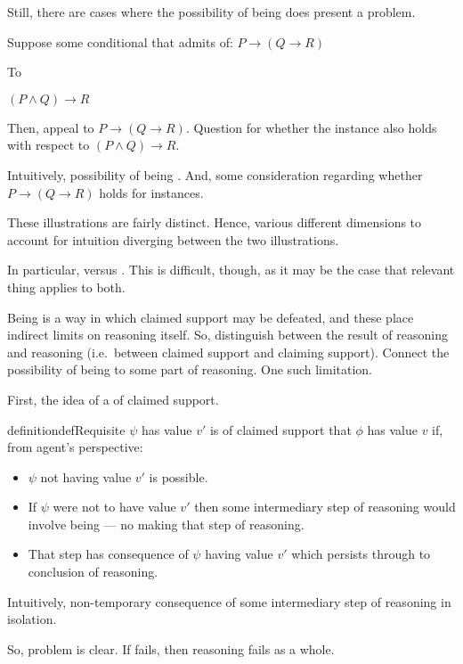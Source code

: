 \begin{note}
  Still, there are cases where the possibility of being \mom{} does present a problem.

  \begin{illustration}
    Suppose some conditional that admits of:
    \(P \rightarrow (Q \rightarrow R)\)

    To

    \((P \land Q) \rightarrow R\)

    Then, appeal to \(P \rightarrow (Q \rightarrow R)\).
    Question for whether the instance also holds with respect to \((P \land Q) \rightarrow R\).
  \end{illustration}

  Intuitively, possibility of being \mistaken{}.
  And, some consideration regarding whether \(P \rightarrow (Q \rightarrow R)\) holds for instances.
\end{note}

\begin{note}
  These illustrations are fairly distinct.
  Hence, various different dimensions to account for intuition diverging between the two illustrations.

  In particular, \mistaken{} versus \misled{}.
  This is difficult, though, as it may be the case that relevant thing applies to both.

  Being \mom{} is a way in which claimed support may be defeated, and these place indirect limits on reasoning itself.
  So, distinguish between the result of reasoning and reasoning (i.e.\ between claimed support and claiming support).
  Connect the possibility of being \mom{} to some part of reasoning.
  One such limitation.
\end{note}

\begin{note}
  First, the idea of a \requ{} of claimed support.

  \begin{restatable}{definition}{defRequisite}\label{def:requisite}
    \(\psi\) has value \(v'\) is \requ{} of claimed support that \(\phi\) has value \(v\) if, from agent's perspective:
    \begin{itemize}
    \item \(\psi\) not having value \(v'\) is possible.
    \item If \(\psi\) were not to have value \(v'\) then some intermediary step of reasoning would involve being \mom{} --- no making that step of reasoning.
    \item That step has consequence of \(\psi\) having value \(v'\) which persists through to conclusion of reasoning.
    \end{itemize}
  \end{restatable}
  Intuitively, non-temporary consequence of some intermediary step of reasoning in isolation.

  So, problem is clear.
  If \requ{} fails, then reasoning fails as a whole.
\end{note}

